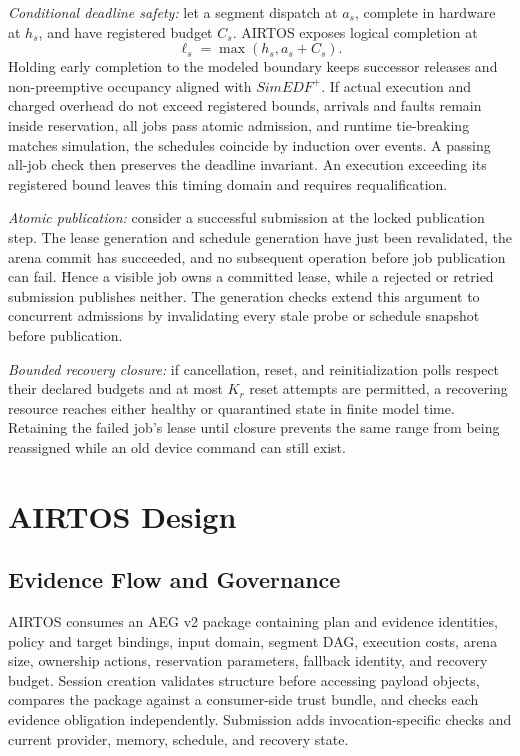 \documentclass[lettersize,journal]{IEEEtran}
\begin{document}
\textit{Conditional deadline safety:} let a segment dispatch at $a_s$,
complete in hardware at $h_s$, and have registered budget $C_s$. AIRTOS exposes
logical completion at
\begin{equation}
\ell_s=\max(h_s,a_s+C_s).
\label{eq:logical}
\end{equation}
Holding early completion to the modeled boundary keeps successor releases and
non-preemptive occupancy aligned with $SimEDF^+$. If actual execution and
charged overhead do not exceed registered bounds, arrivals and faults remain
inside reservation, all jobs pass atomic admission, and runtime tie-breaking
matches simulation, the schedules coincide by induction over events. A passing
all-job check then preserves the deadline invariant. An execution exceeding its
registered bound leaves this timing domain and requires requalification.

\textit{Atomic publication:} consider a successful submission at the locked
publication step. The lease generation and schedule generation have just been
revalidated, the arena commit has succeeded, and no subsequent operation before
job publication can fail. Hence a visible job owns a committed lease, while a
rejected or retried submission publishes neither. The generation checks extend
this argument to concurrent admissions by invalidating every stale probe or
schedule snapshot before publication.

\textit{Bounded recovery closure:} if cancellation, reset, and reinitialization
polls respect their declared budgets and at most $K_r$ reset attempts are
permitted, a recovering resource reaches either healthy or quarantined state in
finite model time. Retaining the failed job's lease until closure prevents the
same range from being reassigned while an old device command can still exist.

\section{AIRTOS Design}
\subsection{Evidence Flow and Governance}
AIRTOS consumes an AEG v2 package containing plan and evidence identities,
policy and target bindings, input domain, segment DAG, execution costs, arena
size, ownership actions, reservation parameters, fallback identity, and
recovery budget. Session creation validates structure before accessing payload
objects, compares the package against a consumer-side trust bundle, and checks
each evidence obligation independently. Submission adds invocation-specific
checks and current provider, memory, schedule, and recovery state.
\end{document}
